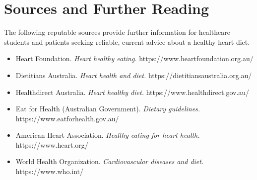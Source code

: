 \section*{Sources and Further Reading}
The following reputable sources provide further information for healthcare students and patients seeking reliable, current advice about a healthy heart diet.

\begin{itemize}
    \item Heart Foundation. \textit{Heart healthy eating.} https://www.heartfoundation.org.au/
    \item Dietitians Australia. \textit{Heart health and diet.} https://dietitiansaustralia.org.au/
    \item Healthdirect Australia. \textit{Heart healthy diet.} https://www.healthdirect.gov.au/
    \item Eat for Health (Australian Government). \textit{Dietary guidelines.} https://www.eatforhealth.gov.au/
    \item American Heart Association. \textit{Healthy eating for heart health.} https://www.heart.org/
    \item World Health Organization. \textit{Cardiovascular diseases and diet.} https://www.who.int/
\end{itemize}

